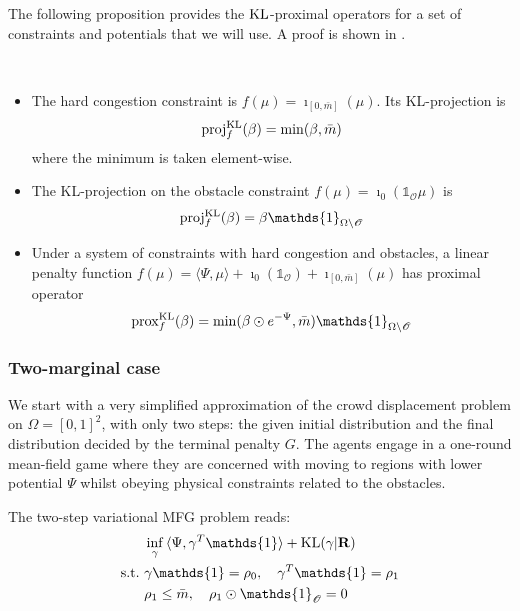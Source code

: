 \documentclass[../report.tex]{subfiles}
\begin{document}
The following proposition provides the $\operatorname{KL}$-proximal operators for a set of constraints and potentials that we will use. A proof is shown in \textcite{peyr2015entropic}.
\begin{prop}\label{prop:CrowdKLProx}~
\begin{itemize}
	\item The hard congestion constraint is $f(\mu) = \imath_{[0,\bar{m}]}(\mu)$. Its KL-projection is
	\begin{equation}
	\operatorname{proj}^{\operatorname{KL}}_f(\beta) = \min(\beta,\bar{m})
	\end{equation}
	where the minimum is taken element-wise.
	\item The KL-projection on the obstacle constraint $f(\mu) = \imath_{0} (\mathds{1}_\mathscr{O}\mu)$ is
	\begin{equation}
	\proj^{\KL}_f (\beta) = \beta \mathds{1}_{\Omega\backslash\mathscr{O}}
	\end{equation}
	\item Under a system of constraints with hard congestion and obstacles, a linear penalty function $f(\mu) = \langle\Psi, \mu\rangle + \imath_0(\mathds{1}_\mathscr{O}) + \imath_{[0,\bar{m}]}(\mu)$ has proximal operator
	\begin{equation}
	\prox^{\KL}_{f}(\beta) =
	\min(\beta\odot e^{-\Psi}, \bar{m}) \mathds{1}_{\Omega\backslash\mathscr{O}}
	\end{equation}
\end{itemize}
\end{prop}


\subsubsection{Two-marginal case}

We start with a very simplified approximation of the crowd displacement problem on $\Omega = [0, 1]^2$, with only two steps: the given initial distribution and the final distribution decided by the terminal penalty $G$. 
The agents engage in a one-round mean-field game where they are concerned with moving to regions with lower potential $\Psi$ whilst obeying physical constraints related to the obstacles.

The two-step variational MFG problem reads:
\begin{equation}\label{eq:2MargFuzzyObstacleObj}
\begin{aligned}
	&\inf_\gamma{} \langle \Psi, \gamma^T\mathds{1}\rangle + \KL(\gamma | \bfR) \\
	\suchthat\ & \gamma\mathds{1} = \rho_0, \quad \gamma^T\mathds{1} = \rho_1  \\
	& \rho_1 \leq \bar{m}, \quad \rho_1\odot \mathds{1}_{\mathscr{O}} = 0
	\end{aligned}
\end{equation}
\end{document}
